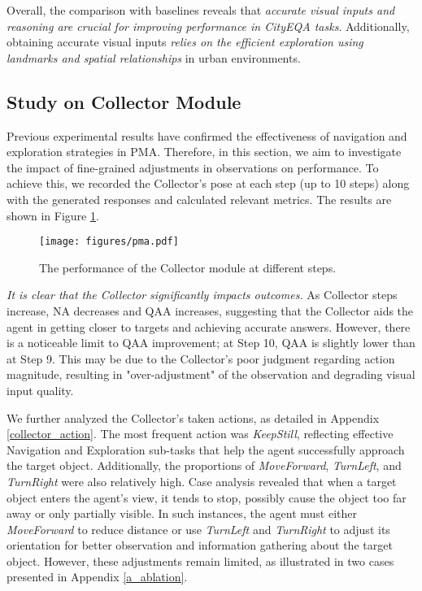 Overall, the comparison with baselines reveals that \textit{accurate visual inputs and reasoning are crucial for improving performance in CityEQA tasks}. Additionally, obtaining accurate visual inputs \textit{relies on the efficient exploration using landmarks and spatial relationships} in urban environments. 
 
\subsection{Study on Collector Module}

Previous experimental results have confirmed the effectiveness of navigation and exploration strategies in PMA. Therefore, in this section, we aim to investigate the impact of fine-grained adjustments in observations on performance. To achieve this, we recorded the Collector's pose at each step (up to 10 steps) along with the generated responses and calculated relevant metrics. The results are shown in Figure \ref{fig:pma}. 

\begin{figure}[!htb]
\centering
    \texttt{[image: figures/pma.pdf]}
\caption{The performance of the Collector module at different steps.}
\label{fig:pma}
\end{figure}

\textit{It is clear that the Collector significantly impacts outcomes.} As Collector steps increase, NA decreases and QAA increases, suggesting that the Collector aids the agent in getting closer to targets and achieving accurate answers. However, there is a noticeable limit to QAA improvement; at Step 10, QAA is slightly lower than at Step 9. This may be due to the Collector's poor judgment regarding action magnitude, resulting in "over-adjustment" of the observation and degrading visual input quality.

We further analyzed the Collector's taken actions, as detailed in Appendix \ref{collector_action}. The most frequent action was \textit{KeepStill}, reflecting effective Navigation and Exploration sub-tasks that help the agent successfully approach the target object. Additionally, the proportions of \textit{MoveForward}, \textit{TurnLeft}, and \textit{TurnRight} were also relatively high. 
Case analysis revealed that when a target object enters the agent’s view, it tends to stop, possibly cause the object too far away or only partially visible. In such instances, the agent must either \textit{MoveForward} to reduce distance or use \textit{TurnLeft} and \textit{TurnRight} to adjust its orientation for better observation and information gathering about the target object. However, these adjustments remain limited, as illustrated in two cases presented in Appendix \ref{a_ablation}.



